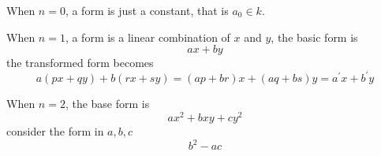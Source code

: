 \documentclass{article}
\begin{document}
When $n = 0$, a form is just a constant, that is $a_0 \in k$.

When $n = 1$, a form is a linear combination of $x$ and $y$, 
the basic form is $$a x + b y$$
the transformed form becomes 
$$a (px + qy) + b (rx + sy) = (ap + br) x + (aq + bs) y = a^\prime x + b^\prime y$$

When $n = 2$, the base form is
$$a x^2 + bxy + cy^2$$
consider the form in $a, b, c$
$$b^2 - ac$$
\end{document}
